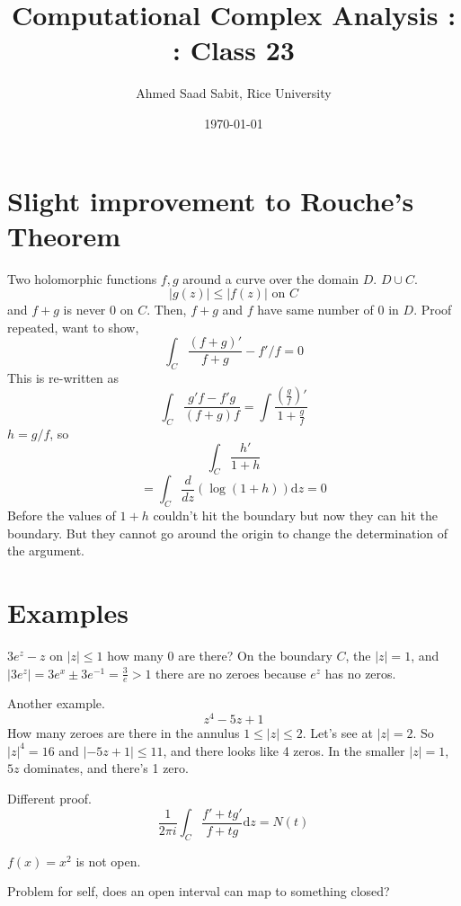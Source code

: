 \documentclass[letter]{article}
\title{Computational Complex Analysis : : Class 23}
\author{Ahmed Saad Sabit, Rice University}
\date{\today}
\begin{document}
\maketitle
\section*{Slight improvement to Rouche's Theorem}
Two holomorphic functions $f,g$ around a curve over the domain $D$. $D \cup C$. 
\[
|g(z)| \le |f(z)| \text{ on } C
\] 
and 
$f+g$ is never $0$ on $C$. Then, $f+g$ and $f$ have same number of $0$ in $D$. Proof repeated, 
want to show, 
\[
\int_C 
\frac{(f+g)'}{f+g} - f'/f = 0
\] 
This is re-written as
\[
\int_C \frac{g'f - f' g}{(f+g) f} = \int \frac{(\frac{g}{f}) ' }{1 + \frac{g}{f}}
\]
$h = g / f$, so 
\[
\int_C \frac{h'}{ 1 + h} 
\] 
\[
= \int_C \frac{d}{dz} \left(\log(1+h)\right)\mathrm{d} z = 0
\] 
Before the values of $1+h$ couldn't hit the boundary but now they can hit the boundary. But they cannot go around the origin to change the determination of the argument. 

\section*{Examples}
$3e^{z} - z$ on $|z| \le 1$ how many $0$ are there? On the boundary $C$, the 
$|z|  = 1$, and 
$|3 e^{z } | = 3 e^{x} \pm 3e^{-1} = \frac{3}{e}> 1$ there are no zeroes because $e^{z}$ has no zeros. 

Another example. 
\[
z^{4} - 5z + 1
\] How many zeroes are there in the annulus $1 \le |z| \le  2$. Let's see at $|z| = 2$. So $|z|^{4} = 16$ and $|-5z + 1| \le 11$, and there looks like 4 zeros. In the smaller $|z| = 1$, 
$5z$ dominates, and there's 1 zero. 

Different proof. 
\[
\frac{1}{2 \pi i } \int_C \frac{f' + t g'}{f+ tg} \mathrm{d} z = N(t)
\] 

$f(x) = x^2 $ is not open. 

Problem for self, does an open interval can map to something closed? 
\end{document}
